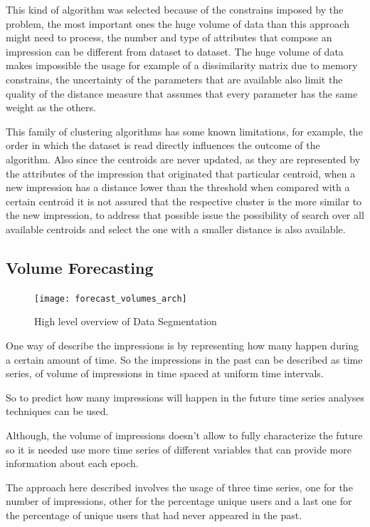 This kind of algorithm was selected because of the constrains imposed by the
problem, the most important ones the huge volume of data than this approach
might need to process, the number and type of attributes that compose an
impression can be different from dataset to dataset. The huge volume of data
makes impossible the usage for example of a dissimilarity matrix due to memory
constrains, the uncertainty of the parameters that are available also limit the
quality of the distance measure that assumes that every parameter has the same
weight as the others.

This family of clustering algorithms has some known limitations, for example, the
order in which the dataset is read directly influences the outcome of the
algorithm. Also since the centroids are never updated, as they are represented
by the attributes of the impression that originated that particular centroid,
when a new impression has a distance lower than the threshold when compared with
a certain centroid it is not assured that the respective cluster is the more
similar to the new impression, to address that possible issue the possibility of
search over all available centroids and select the one with a smaller distance
is also available.

\subsection{Volume Forecasting}

\begin{figure}[h] \begin{center} \leavevmode
\texttt{[image: forecast\_volumes\_arch]} \caption{ High level overview
of Data Segmentation} \label{fig:forecast_volumes_arch} \end{center} \end{figure}

One way of describe the impressions is by representing how many happen during a
certain amount of time. So the impressions in the past can be described as time
series, of volume of impressions in time spaced at uniform time intervals. 

So to predict how many impressions will happen in the future time series
analyses techniques can be used. 

Although, the volume of impressions doesn't allow to fully characterize the future so
 it is needed use more time series of different variables that can provide more
 information about each epoch.

The approach here described involves the usage of three time series, one for the
number of impressions, other for the percentage unique users and a last one for
the percentage of unique users that had never appeared in the past.

